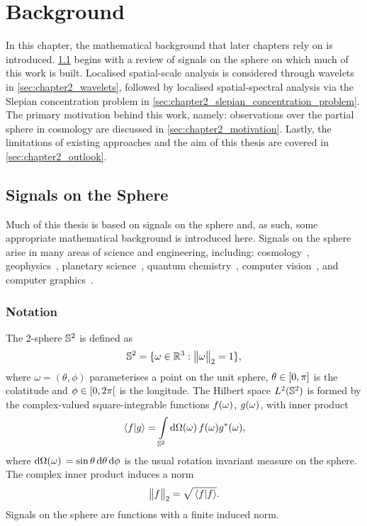 \chapter{Background}\label{sec:chapter2}

In this chapter, the mathematical background that later chapters rely on is introduced.
\cref{sec:chapter2_signals_sphere} begins with a review of signals on the sphere on which much of this work is built.
Localised spatial-scale analysis is considered through wavelets in \cref{sec:chapter2_wavelets}, followed by localised spatial-spectral analysis via the Slepian concentration problem in \cref{sec:chapter2_slepian_concentration_problem}.
The primary motivation behind this work, namely: observations over the partial sphere in cosmology are discussed in \cref{sec:chapter2_motivation}.
Lastly, the limitations of existing approaches and the aim of this thesis are covered in \cref{sec:chapter2_outlook}.

\section{Signals on the Sphere}\label{sec:chapter2_signals_sphere}

Much of this thesis is based on signals on the sphere and, as such, some appropriate mathematical background is introduced here.
Signals on the sphere arise in many areas of science and engineering, including: cosmology~\cite{Bennett1996}, geophysics~\cite{Simons2006}, planetary science~\cite{Turcotte1981}, quantum chemistry~\cite{Choi1999}, computer vision~\cite{Cohen2018,Esteves2020,Cobb2021}, and computer graphics~\cite{Ramamoorthi2004}.

\subsection{Notation}\label{sec:chapter2_notation}

The 2-sphere \(\mathbb{S}^{2}{}\) is defined as
%
\begin{equation}
	\mathbb{S}^{2}{}
	= \{\omega \in \mathbb{R}^{3} : {\big\lVert\omega\big\rVert}_{2} = 1\},
\end{equation}
%
where \(\omega=(\theta,\phi)\) parameterises a point on the unit sphere, \(\theta \in \interval{0}{\pi}\) is the colatitude and \(\phi \in \interval[open right]{0}{2\pi}\) is the longitude.
The Hilbert space \(L^{2}(\mathbb{S}^{2})\) is formed by the complex-valued square-integrable functions \(f(\omega)\), \(g(\omega)\), with inner product
%
\begin{equation}
	\braket*{f}{g}
	= \displaystyle\int\limits_{\mathbb{S}^{2}} \dd{\Omega(\omega)} f(\omega) g^{\ast}(\omega),
\end{equation}
%
where \(\dd{\Omega(\omega)}{} = \sin{\theta} \dd{\theta} \dd{\phi}\) is the usual rotation invariant measure on the sphere.
The complex inner product induces a norm
%
\begin{equation}
	{\big\lVert f\big\rVert}_{2}
	= \sqrt{\braket*{f}}.
\end{equation}
%
Signals on the sphere are functions with a finite induced norm.

